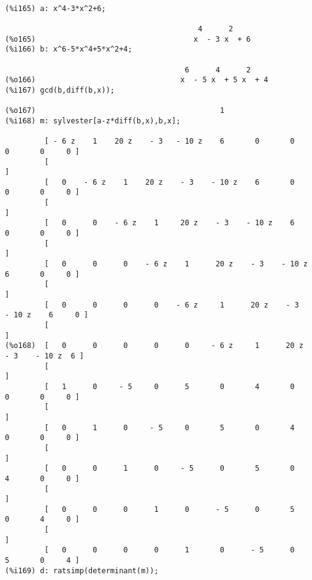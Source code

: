 {\small\begin{verbatim}

(%i165) a: x^4-3*x^2+6;

                                            4      2
(%o165)                                    x  - 3 x  + 6
(%i166) b: x^6-5*x^4+5*x^2+4;

                                         6      4      2
(%o166)                                 x  - 5 x  + 5 x  + 4
(%i167) gcd(b,diff(b,x));

(%o167)                                          1
(%i168) m: sylvester[a-z*diff(b,x),b,x];

         [ - 6 z    1    20 z    - 3   - 10 z    6       0       0       0       0     0 ]
         [                                                                               ]
         [   0    - 6 z    1    20 z    - 3    - 10 z    6       0       0       0     0 ]
         [                                                                               ]
         [   0      0    - 6 z    1     20 z    - 3    - 10 z    6       0       0     0 ]
         [                                                                               ]
         [   0      0      0    - 6 z    1      20 z    - 3    - 10 z    6       0     0 ]
         [                                                                               ]
         [   0      0      0      0    - 6 z     1      20 z    - 3    - 10 z    6     0 ]
         [                                                                               ]
(%o168)  [   0      0      0      0      0     - 6 z     1      20 z    - 3    - 10 z  6 ]
         [                                                                               ]
         [   1      0     - 5     0      5       0       4       0       0       0     0 ]
         [                                                                               ]
         [   0      1      0     - 5     0       5       0       4       0       0     0 ]
         [                                                                               ]
         [   0      0      1      0     - 5      0       5       0       4       0     0 ]
         [                                                                               ]
         [   0      0      0      1      0      - 5      0       5       0       4     0 ]
         [                                                                               ]
         [   0      0      0      0      1       0      - 5      0       5       0     4 ]
(%i169) d: ratsimp(determinant(m));


\end{verbatim}}
